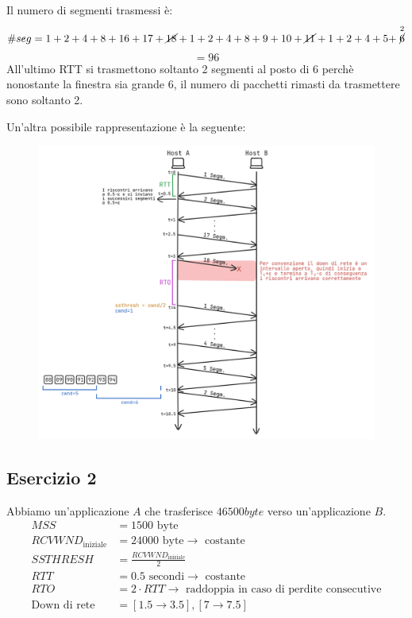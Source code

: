 \documentclass[a4paper]{article}
\begin{document}
\noindent
Il numero di segmenti trasmessi è:
\[
  \#seg = 1 + 2 + 4 + 8 + 16 + 17 + \cancel{18} + 1 + 2 + 4 + 8 + 9 + 10 + \cancel{11}
  + 1 + 2 + 4 + 5 + \stackrel{2}{\cancel{6}}
\] 
\[
  = 96
\] 
All'ultimo RTT si trasmettono soltanto 2 segmenti al posto di 6 perchè nonostante la 
finestra sia grande 6, il numero di pacchetti rimasti da trasmettere sono soltanto 2.

\vspace{1em}
\noindent
Un'altra possibile rappresentazione è la seguente:
\begin{figure}[H]
  \centering
  \includegraphics[width=1\textwidth]{../figures/es-tcp1}
\end{figure}


\subsection{Esercizio 2}
Abbiamo un'applicazione \( A \) che trasferisce \( 46500byte \) verso un'applicazione \( B \).
\[
\begin{aligned}
  MSS &= 1500 \text{ byte}\\
  RCVWND_{\text{iniziale}} &= 24000 \text{ byte} \to \text{ costante}\\
  SSTHRESH &= \frac{RCVWND_{\text{iniziale}}}{2}\\
  RTT &= 0.5 \text{ secondi} \to \text{ costante}\\
  RTO &= 2 \cdot RTT \to \text{ raddoppia in caso di perdite consecutive}\\
  \text{Down di rete} &= [1.5 \to 3.5],[7 \to 7.5]
\end{aligned}
\] 
\end{document}
